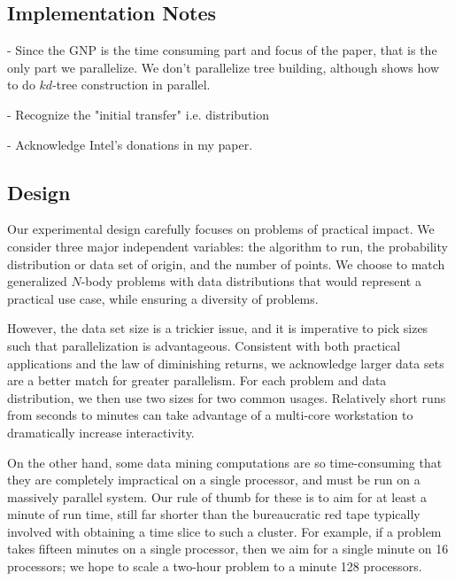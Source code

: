 \documentclass[twoside,leqno,twocolumn]{article}
\begin{document}
\subsection{Implementation Notes}

- Since the GNP is the time consuming part and focus of the paper, that is the only part we parallelize.
We don't parallelize tree building, although \cite{xyz} shows how to do $kd$-tree construction in parallel.

- Recognize the "initial transfer" i.e. distribution

- Acknowledge Intel's donations in my paper.

\subsection{Design}


Our experimental design carefully focuses on problems of practical impact.
We consider three major independent variables: the algorithm to run, the probability distribution or data set of origin, and the number of points.
We choose to match generalized $N$-body problems with data distributions that would represent a practical use case, while ensuring a diversity of problems.

However, the data set size is a trickier issue, and it is imperative to pick sizes such that parallelization is advantageous.
Consistent with both practical applications and the law of diminishing returns, we acknowledge larger data sets are a better match for greater parallelism.
For each problem and data distribution, we then use two sizes for two common usages.
Relatively short runs from seconds to minutes can take advantage of a multi-core workstation to dramatically increase interactivity.

On the other hand, some data mining computations are so time-consuming that they are completely impractical on a single processor, and must be run on a massively parallel system.
Our rule of thumb for these is to aim for at least a minute of run time, still far shorter than the bureaucratic red tape typically involved with obtaining a time slice to such a cluster.
For example, if a problem takes fifteen minutes on a single processor, then we aim for a single minute on 16 processors; we hope to scale a two-hour problem to a minute 128 processors.
\end{document}

